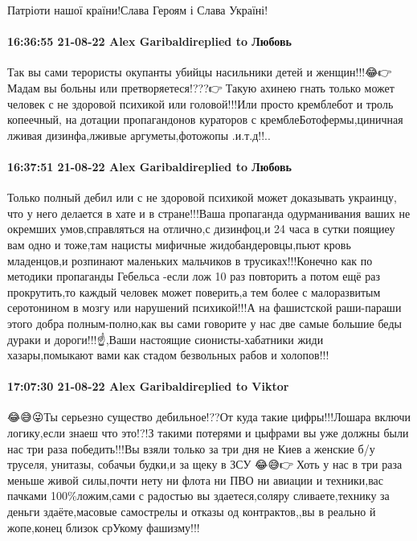 Патріоти нашої країни!Слава Героям і Слава Україні!

\paragraph{16:36:55 21-08-22 Alex Garibaldireplied to Любовь}

Так вы сами терористы окупанты убийцы насильники детей и женщин!!!😂👉🤕Мадам
вы больны или претворяетеся!???👉🤕Такую ахинею гнать только может человек с не
здоровой психикой или головой!!!Или просто кремблебот и троль копеечный, на
дотации пропагандонов кураторов с кремблеБотофермы,циничная лживая
дизинфа,лживые аргуметы,фотожопы .и.т.д!!..

\paragraph{16:37:51 21-08-22 Alex Garibaldireplied to Любовь}

Только полный дебил или с не здоровой психикой может доказывать украинцу, что у
него делается в хате и в стране!!!Ваша пропаганда одурманивания ваших не
окремших умов,справляться на отлично,с дизинфоц,и 24 часа в сутки поящиеу вам
одно и тоже,там нацисты мифичные жидобандеровцы,пьют кровь младенцов,и
розпинают маленьких мальчиков в трусиках!!!Конечно как по методики пропаганды
Гебельса -если лож 10 раз повторить а потом ещё раз прокрутить,то каждый
человек может поверить,а тем более с малоразвитым серотонином в мозгу или
нарушений психикой!!!А на фашистской раши-параши этого добра полным-полно,как
вы сами говорите у нас две самые большие беды дураки и дороги!!!☝️,Ваши
настоящие сионисты-хабатники жиди хазары,помыкают вами как стадом безвольных
рабов и холопов!!!

\paragraph{17:07:30 21-08-22 Alex Garibaldireplied to Viktor}

😂😅😜Ты серьезно существо дебильное!??От куда такие цифры!!!Лошара включи
логику,если знаеш что это!?!З такими потерями и цыфрами вы уже должны были нас
три раза победить!!!Вы взяли только за три дня не Киев а женские б/у труселя,
унитазы, собачьи будки,и за щеку в ЗСУ 😂😅👉🤕Хоть у нас в три раза меньше
живой силы,почти нету ни флота ни ПВО ни авиации и техники,вас пачками
100\%ложим,сами с радостью вы здаетеся,соляру сливаете,технику за деньги
здаёте,масовые самострелы и отказы од контрактов,,вы в реально й жопе,конец
близок  срУкому фашизму!!!


